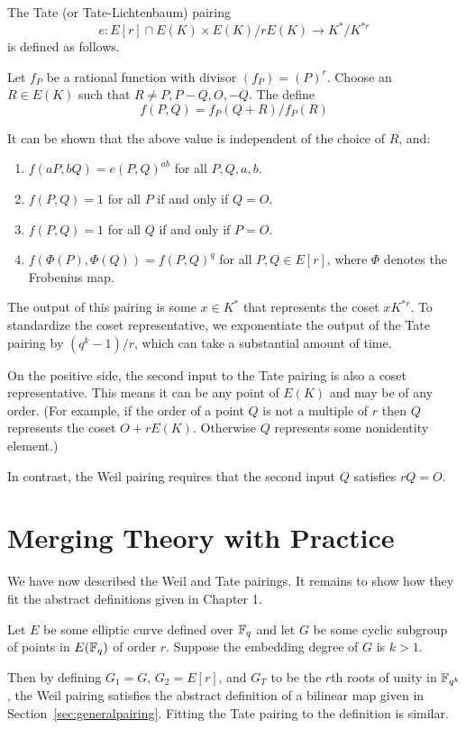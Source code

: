 The Tate (or Tate-Lichtenbaum) pairing
\[
e : E[r] \cap E(K) \times
E(K) / r E(K) \rightarrow
K^* / K^{*r}
\]
is defined as follows.

Let $f_P$ be a rational function with divisor $(f_P) = (P)^r$.
Choose an $R\in E(K)$ such that $R \ne P, P-Q, O, -Q$. The define
\[
f(P, Q) = f_P (Q + R) / f_P (R)
\]

It can be shown that the above value is independent of the choice of $R$,
and:
\begin{enumerate}
\item
$f(a P, b Q) = e(P, Q)^{a b}$ for all $P, Q, a, b$.
\item
$f(P,Q) = 1$ for all $P$ if and only if $Q = O$.
\item
$f(P,Q) = 1$ for all $Q$ if and only if $P = O$.
\item
$f(\Phi(P),\Phi(Q)) = f(P,Q)^{q}$ for all $P,Q \in E[r]$,
where $\Phi$ denotes the Frobenius map.
\end{enumerate}

The output of this pairing is some $x \in K^*$
that represents the coset $x K^{*r}$. To standardize the coset
representative, we exponentiate the output of the Tate pairing
by $(q^k - 1) / r$, which can take a substantial amount of time.

On the positive side, the second input to the Tate pairing is also a coset
representative. This means it can be any point of $E(K)$ and may
be of any order. (For example,
if the order of a point $Q$ is not a multiple of $r$ then $Q$ represents
the coset $O + r E(K)$. Otherwise $Q$ represents some nonidentity
element.)

In contrast, the Weil pairing requires that the second
input $Q$ satisfies $r Q = O$.

\section {Merging Theory with Practice}

We have now described the Weil and Tate pairings. It remains to show
how they fit the abstract definitions given in Chapter 1.

Let $E$ be some elliptic curve defined over $\mathbb{F}_q$ and let $G$ be some
cyclic subgroup of points in $E(\mathbb{F}_q)$ of order $r$.
Suppose the embedding degree of $G$ is $k > 1$.

Then by defining $G_1 = G$, $G_2 = E[r]$, and $G_T$ to be the $r$th roots
of unity in $\mathbb{F}_{q^k}$, the Weil pairing satisfies the abstract
definition of a bilinear map given in Section~\ref{sec:generalpairing}.
Fitting the Tate pairing to the definition is similar.

